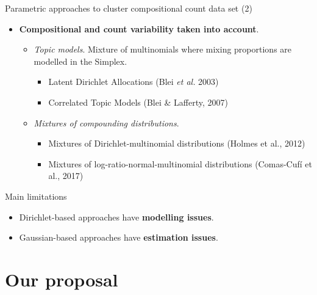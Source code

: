 \documentclass[9pt]{beamer}
\begin{document}
\begin{frame}{Parametric approaches to cluster compositional count data set (2)}


\begin{itemize}
\item \textbf{{\color{green}Compositional} and {\color{green}count} variability taken into account}.\vspace{0.25cm}
\begin{itemize}
\item \textit{Topic models}. Mixture of multinomials where mixing proportions are modelled in the Simplex.\vspace{0.25cm}
\begin{itemize}
\item Latent Dirichlet Allocations (Blei \textit{et al.} 2003)
\item Correlated Topic Models (Blei \& Lafferty, 2007)
\end{itemize}\vspace{0.25cm}
\item \textit{Mixtures of compounding distributions}.\vspace{0.25cm}
\begin{itemize}
\item Mixtures of Dirichlet-multinomial distributions (Holmes et al., 2012)
\item Mixtures of log-ratio-normal-multinomial distributions (Comas-Cufí et al., 2017)
\end{itemize}
\end{itemize}
\end{itemize}

\pause
\begin{alertblock}{Main limitations}
\begin{itemize}
\item Dirichlet-based approaches have  \textbf{modelling issues}.
\item Gaussian-based approaches have  \textbf{estimation issues}.
\end{itemize}
\end{alertblock}

\end{frame}

\section{Our proposal}
\end{document}
